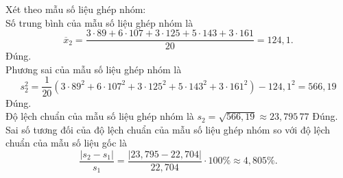 \begin{ex}
{\begin{itemchoice}
			Xét theo mẫu số liệu ghép nhóm:\\
			Số trung bình của mẫu số liệu ghép nhóm là $$\overline x_2=\dfrac{3\cdot 89+6\cdot 107+3\cdot 125+5\cdot 143+3\cdot 161}{20}=124{,}1.$$
			\itemch Đúng.\\
			Phương sai của mẫu số liệu ghép nhóm là
			$$
			s_2^2=\dfrac{1}{20}\left(3\cdot 89^2+6\cdot 107^2+3\cdot 125^2+5\cdot 143^2+3\cdot 161^2\right)-124{,}1^2=566{,}19
			$$
			\itemch Đúng.\\
			Độ lệch chuẩn của mẫu số liệu ghép nhóm là $s_2=\sqrt{566{,}19}\approx 23{,}795\,77$
			\itemch Đúng.\\
			Sai số tương đối của độ lệch chuẩn của mẫu số liệu ghép nhóm so với độ lệch chuẩn của mẫu số liệu gốc là $$\dfrac{\left|s_2-s_1\right|}{s_1}=\dfrac{|23{,}795-22{,}704|}{22{,}704}\cdot 100 \% \approx 4{,}805 \%.$$
		\end{itemchoice}
	}
\end{ex}


